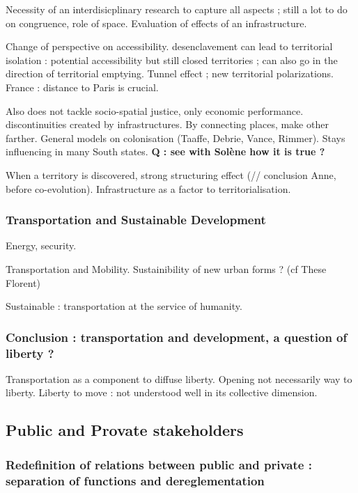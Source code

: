 Necessity of an interdisicplinary research to capture all aspects ; still a lot to do on congruence, role of space. Evaluation of effects of an infrastructure.

Change of perspective on accessibility. desenclavement can lead to territorial isolation : potential accessibility but still closed territories ; can also go in the direction of territorial emptying. Tunnel effect ; new territorial polarizations. France : distance to Paris is crucial.

Also does not tackle socio-spatial justice, only economic performance. discontinuities created by infrastructures. By connecting places, make other farther. General models on colonisation (Taaffe, Debrie, Vance, Rimmer). Stays influencing in many South states. \textbf{Q : see with Sol{\`e}ne how it is true ?}

When a territory is discovered, strong structuring effect (// conclusion Anne, before co-evolution). Infrastructure as a factor to territorialisation.


\subsubsection{Transportation and Sustainable Development}

Energy, security.

Transportation and Mobility. Sustainibility of new urban forms ? (cf These Florent)

Sustainable : transportation at the service of humanity.

\subsubsection{Conclusion : transportation and development, a question of liberty ?}

Transportation as a component to diffuse liberty. Opening not necessarily way to liberty. Liberty to move : not understood well in its collective dimension.




\subsection{Public and Provate stakeholders}

\subsubsection{Redefinition of relations between public and private : separation of functions and dereglementation}

